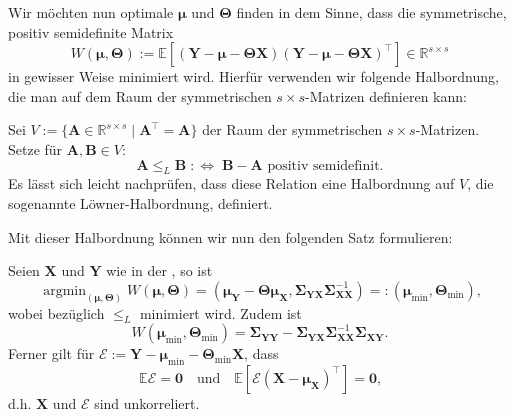 \documentclass[]{article}
\newcommand{\E}{\mathbb{E}}
\newcommand{\R}{\mathbb{R}}
\newcommand{\X}{\mathbf{X}}
\newcommand{\Y}{\mathbf{Y}}
\newcommand{\T}{\mathbf{\Theta}}
\newcommand{\muu}{\bm{\mu}}
\newcommand{\Ssigma}{\mathbf{\Sigma}}
\newcommand{\A}{\mathbf{A}}
\newcommand{\B}{\mathbf{B}}
\DeclareMathOperator*{\argmin}{argmin}
\begin{document}
Wir möchten nun optimale $\muu$ und $\T$ finden in dem Sinne, dass die symmetrische, positiv semidefinite Matrix
$$W(\muu, \T) := \E[(\Y - \muu - \T \X)(\Y - \muu - \T \X)^\top] \in \R^{s \times s}$$ in gewisser Weise minimiert wird. Hierfür verwenden wir folgende Halbordnung, die man auf dem Raum der symmetrischen $s \times s$-Matrizen definieren kann:

\begin{definition}
	Sei $V:= \{\A \in \R^{s \times s} \;|\; \A^\top = \A \}$ der Raum der symmetrischen $s \times s$-Matrizen. Setze für $\A, \B \in V$:
	$$\A \leq_L \B \; :\Leftrightarrow \; \B - \A \text{ positiv semidefinit.}$$
	Es lässt sich leicht nachprüfen, dass diese Relation eine Halbordnung auf $V$, die sogenannte Löwner-Halbordnung, definiert.
\end{definition}
Mit dieser Halbordnung können wir nun den folgenden Satz formulieren:
\begin{theorem}
	\label{thm:mr}
	Seien $\X$ und $\Y$ wie in der , so ist
	$$ \argmin_{(\muu, \T)} W(\muu, \T) = (\muu_\Y - \T \muu_\X, \Ssigma_{\Y\X} \Ssigma_{\X\X}^{-1}) =: (\muu_{\min}, \T_{\min}) \text{,} $$
	wobei bezüglich $\leq_L$ minimiert wird. Zudem ist
	$$W(\muu_{\min}, \T_{\min}) = \Ssigma_{\Y\Y} - \Ssigma_{\Y\X} \Ssigma_{\X\X}^{-1} \Ssigma_{\X\Y} \text{.}$$
	Ferner gilt für $\mathcal{E} := \Y - \muu_{\min} - \T_{\min} \X$, dass 
	$$\E \mathcal{E} = \mathbf{0} \quad \text{und} \quad \E[\mathcal{E}(\X - \muu_\X)^\top] = \mathbf{0} \text{,}$$
	d.h. $\X$ und $\mathcal{E}$ sind unkorreliert.
\end{theorem} 
\end{document}
